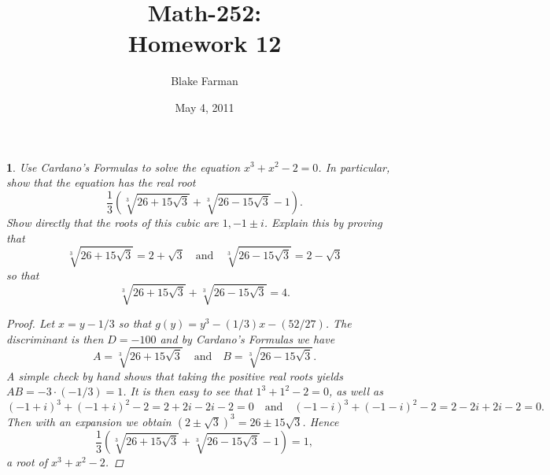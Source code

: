 \documentclass[10pt]{amsart}
\author{Blake Farman}
\title{Math-252:\\Homework 12}
\date{May 4, 2011}
\begin{document}
\maketitle

\newtheorem{thm}{}

\begin{thm}
  \label{Ex1}
  Use Cardano's Formulas to solve the equation $x^3 + x^2 -2 = 0$.
  In particular, show that the equation has the real root
  $$\frac{1}{3}\left( \sqrt[3]{26 + 15\sqrt{3}} + \sqrt[3]{26 - 15\sqrt{3}} - 1\right).$$
  Show directly that the roots of this cubic are $1, -1 \pm i$.
  Explain this by proving that 
  $$\sqrt[3]{26 + 15\sqrt{3}} = 2 + \sqrt{3} \quad \text{and} \quad \sqrt[3]{26 - 15\sqrt{3}} = 2 - \sqrt{3}$$
  so that
  $$\sqrt[3]{26 + 15\sqrt{3}} + \sqrt[3]{26 - 15\sqrt{3}} = 4.$$
  
  \begin{proof}
    Let $x = y - 1/3$ so that $g(y) = y^3 - (1/3)x - (52/27)$.  
    The discriminant is then $D = -100$ and by Cardano's Formulas we have
    $$A = \sqrt[3]{26 + 15\sqrt{3}} \quad \text{and} \quad B = \sqrt[3]{26 - 15\sqrt{3}}.$$
    A simple check by hand shows that taking the positive real roots yields $AB = -3\cdot(-1/3) = 1$.
    It is then easy to see that $1^3 +1^2 -2 = 0$, as well as $$(-1+i)^3 + (-1 + i)^2 -2 = 2 + 2i - 2i - 2 = 0 \quad \text{and} \quad (-1-i)^3 + (-1 - i)^2 - 2 = 2 - 2i + 2i - 2 = 0.$$
    Then with an expansion we obtain $(2 \pm \sqrt{3})^3 = 26 \pm 15\sqrt{3}$.
    Hence $$\frac{1}{3}\left( \sqrt[3]{26 + 15\sqrt{3}} + \sqrt[3]{26 - 15\sqrt{3}} - 1\right) = 1,$$
    a root of $x^3 + x^2 - 2$.
  \end{proof}
\end{thm}
\end{document}
